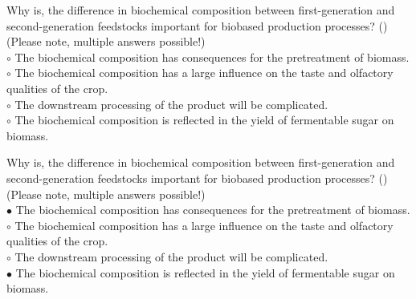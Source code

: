 \documentclass[]{beamer}
\begin{document}
\begin{CJK}{UTF8}{gbsn}
\begin{frame}[shrink] {}
\addtocounter{questions}{1}
\color{blue}
Why is, the difference in biochemical composition between first-generation and second-generation feedstocks important for biobased production processes?
({})\\
(Please note, multiple answers possible!)
\\
\color{black}
\setlength{\parindent}{-0.4cm}
{\color{red}$\circ$}  The biochemical composition has consequences for the pretreatment  of biomass.  \\
{\color{red}$\circ$} The biochemical composition has a large influence on the taste and olfactory qualities of the crop.  \\
{\color{red}$\circ$} The downstream processing of the product will be complicated.  \\
{\color{red}$\circ$}  The biochemical composition is reflected in the yield of fermentable sugar on biomass.  \\
\end{frame}
\begin{frame}[shrink] {}
\addtocounter{answers}{1}
\color{blue}
Why is, the difference in biochemical composition between first-generation and second-generation feedstocks important for biobased production processes?
({})\\
(Please note, multiple answers possible!)
\\
\color{black}
\setlength{\parindent}{-0.4cm}
{\color{red}$\bullet$} The biochemical composition has consequences for the pretreatment  of biomass.  \\
{\color{red}$\circ$} The biochemical composition has a large influence on the taste and olfactory qualities of the crop.  \\
{\color{red}$\circ$} The downstream processing of the product will be complicated.  \\
{\color{red}$\bullet$} The biochemical composition is reflected in the yield of fermentable sugar on biomass.  \\
\end{frame}



\end{CJK}
\end{document}
